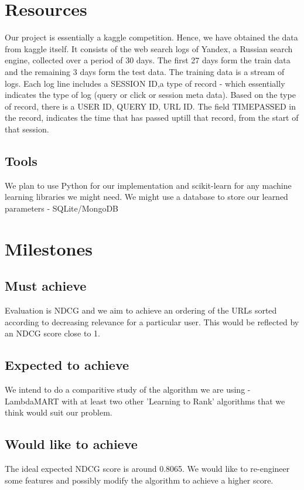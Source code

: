 \documentclass[11pt]{article}
\begin{document}
\section{Resources}
Our project is essentially a kaggle competition. Hence, we have obtained the data from kaggle itself. It consists of the web search logs of Yandex, a Russian search engine, collected over a period of 30 days. The first 27 days form the train data and the remaining 3 days form the test data. \newline
The training data is a stream of logs. Each log line includes a SESSION ID,a type of record  - which essentially indicates the type of log (query or click or session meta data). Based on the type of record, there is a USER ID, QUERY ID, URL ID. The field TIMEPASSED in the record, indicates the time that has passed uptill that record, from the start of that session. 

\subsection{Tools}
We plan to use Python for our implementation and scikit-learn for any machine learning libraries we might need. \newline
We might use a database to store our learned parameters - SQLite/MongoDB
\section{Milestones}
\subsection{Must achieve}
Evaluation is NDCG and we aim to achieve an ordering of the URLs sorted according to decreasing relevance for a particular user. This would be reflected by an NDCG score close to 1.     
\subsection{Expected to achieve}
We intend to do a comparitive study of the algorithm we are using - LambdaMART with at least two other 'Learning to Rank' algorithms that we think would suit our problem. 
\subsection{Would like to achieve}
The ideal expected NDCG score is around 0.8065. We would like to re-engineer some features and possibly modify the algorithm to achieve a higher score.  
\end{document}

